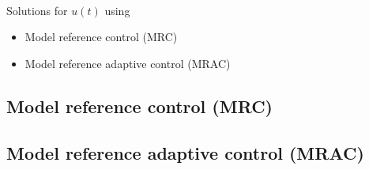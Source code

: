 ~

Solutions for $u(t)$ using
\begin{itemize}
\item Model reference control (MRC)
\item Model reference adaptive control (MRAC)
\end{itemize}

\subsection{Model reference control (MRC)}


\subsection{Model reference adaptive control (MRAC)}


